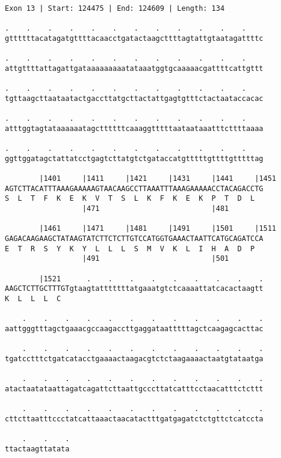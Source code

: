 \documentclass{article}
\begin{document}
\begin{Verbatim}[fontfamily=courier]
Exon 13 | Start: 124475 | End: 124609 | Length: 134

.    .    .    .    .    .    .    .    .    .    .    .    
gttttttacatagatgttttacaacctgatactaagcttttagtattgtaatagattttc

.    .    .    .    .    .    .    .    .    .    .    .    
attgttttattagattgataaaaaaaaatataaatggtgcaaaaacgattttcattgttt

.    .    .    .    .    .    .    .    .    .    .    .    
tgttaagcttaataatactgaccttatgcttactattgagtgtttctactaataccacac

.    .    .    .    .    .    .    .    .    .    .    .    
atttggtagtataaaaaatagcttttttcaaaggtttttaataataaatttcttttaaaa

.    .    .    .    .    .    .    .    .    .    .    .    
ggttggatagctattatcctgagtcttatgtctgataccatgtttttgttttgtttttag

        |1401     |1411     |1421     |1431     |1441     |1451
AGTCTTACATTTAAAGAAAAAGTAACAAGCCTTAAATTTAAAGAAAAACCTACAGACCTG
S  L  T  F  K  E  K  V  T  S  L  K  F  K  E  K  P  T  D  L  
                  |471                          |481        

        |1461     |1471     |1481     |1491     |1501     |1511
GAGACAAGAAGCTATAAGTATCTTCTCTTGTCCATGGTGAAACTAATTCATGCAGATCCA
E  T  R  S  Y  K  Y  L  L  L  S  M  V  K  L  I  H  A  D  P  
                  |491                          |501        

        |1521      .    .    .    .    .    .    .    .    .
AAGCTCTTGCTTTGTgtaagtatttttttatgaaatgtctcaaaattatcacactaagtt
K  L  L  L  C                                               

    .    .    .    .    .    .    .    .    .    .    .    .
aattgggtttagctgaaacgccaagaccttgaggataatttttagctcaagagcacttac

    .    .    .    .    .    .    .    .    .    .    .    .
tgatcctttctgatcatacctgaaaactaagacgtctctaagaaaactaatgtataatga

    .    .    .    .    .    .    .    .    .    .    .    .
atactaatataattagatcagattcttaattgcccttatcatttcctaacatttctcttt

    .    .    .    .    .    .    .    .    .    .    .    .
cttcttaatttccctatcattaaactaacatactttgatgagatctctgttctcatccta

    .    .    .
ttactaagttatata
\end{Verbatim}
\newpage
\end{document}
